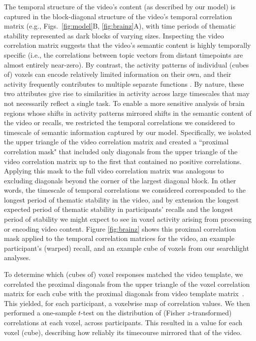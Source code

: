 \documentclass{article}
\begin{document}
The temporal structure of the video's content (as described by our model) is captured in the block-diagonal structure of the video's temporal correlation matrix (e.g., Figs.~\ref{fig:model}B, \ref{fig:brainz}A), with time periods of thematic stability represented as dark blocks of varying sizes.  Inspecting the video correlation matrix suggests that the video's semantic content is highly temporally specific (i.e., the correlations between topic vectors from distant timepoints are almost entirely near-zero).  By contrast, the activity patterns of individual (cubes of) voxels can encode relatively limited information on their own, and their activity frequently contributes to multiple separate functions \citep{FreeEtal01, SigmDeha08, CharKoec10, RishEtal13}.  By nature, these two attributes give rise to similarities in activity across large timescales that may not necessarily reflect a single task.  To enable a more sensitive analysis of brain regions whose shifts in activity patterns mirrored shifts in the semantic content of the video or recalls, we restricted the temporal correlations we considered to timescale of semantic information captured by our model.  Specifically, we isolated the upper triangle of the video correlation matrix and created a ``proximal correlation mask" that included only diagonals from the upper triangle of the video correlation matrix up to the first that contained no positive correlations.  Applying this mask to the full video correlation matrix was analogous to excluding diagonals beyond the corner of the largest diagonal block.  In other words, the timescale of temporal correlations we considered corresponded to the longest period of thematic stability in the video, and by extension the longest expected period of thematic stability in participants' recalls and the longest period of stability we might expect to see in voxel activity arising from processing or encoding video content.  Figure \ref{fig:brainz} shows this proximal correlation mask applied to the temporal correlation matrices for the video, an example participant's (warped) recall, and an example cube of voxels from our searchlight analyses.

To determine which (cubes of) voxel responses matched the video template, we correlated the proximal diagonals from the upper triangle of the voxel correlation matrix for each cube with the proximal diagonals from video template matrix~\citep{KrieEtal08b}.  This yielded, for each participant, a voxelwise map of correlation values.  We then performed a one-sample $t$-test on the distribution of (Fisher $z$-transformed) correlations at each voxel, across participants.  This resulted in a value for each voxel (cube), describing how reliably its timecourse mirrored that of the video.
\end{document}
